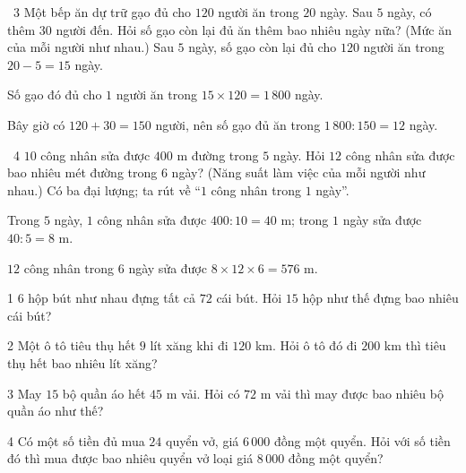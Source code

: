 \gap
\begin{exbox}{\ExWord\ 3}
Một bếp ăn dự trữ gạo đủ cho $120$ người ăn trong $20$ ngày. Sau $5$ ngày, có thêm $30$ người đến. Hỏi số gạo còn lại đủ ăn thêm bao nhiêu ngày nữa? (Mức ăn của mỗi người như nhau.)
\guide
Sau $5$ ngày, số gạo còn lại đủ cho $120$ người ăn trong $20-5=15$ ngày.\par
Số gạo đó đủ cho $1$ người ăn trong $15\times120=1\,800$ ngày.\par
Bây giờ có $120+30=150$ người, nên số gạo đủ ăn trong $1\,800:150=12$ ngày.
\end{exbox}
\gap
\begin{exbox}{\ExWord\ 4}
$10$ công nhân sửa được $400$ m đường trong $5$ ngày. Hỏi $12$ công nhân sửa được bao nhiêu mét đường trong $6$ ngày? (Năng suất làm việc của mỗi người như nhau.)
\guide
Có ba đại lượng; ta rút về ``$1$ công nhân trong $1$ ngày''.\par
Trong $5$ ngày, $1$ công nhân sửa được $400:10=40$ m; trong $1$ ngày sửa được $40:5=8$ m.\par
$12$ công nhân trong $6$ ngày sửa được $8\times12\times6=576$ m.
\end{exbox}
\begin{probbox}{1}{\relax}
$6$ hộp bút như nhau đựng tất cả $72$ cái bút. Hỏi $15$ hộp như thế đựng bao nhiêu cái bút?
\end{probbox}
\gap
\begin{probbox}{2}{\relax}
Một ô tô tiêu thụ hết $9$ lít xăng khi đi $120$ km. Hỏi ô tô đó đi $200$ km thì tiêu thụ hết bao nhiêu lít xăng?
\end{probbox}
\gap
\begin{probbox}{3}{\relax}
May $15$ bộ quần áo hết $45$ m vải. Hỏi có $72$ m vải thì may được bao nhiêu bộ quần áo như thế?
\end{probbox}
\gap
\begin{probbox}{4}{\relax}
Có một số tiền đủ mua $24$ quyển vở, giá $6\,000$ đồng một quyển. Hỏi với số tiền đó thì mua được bao nhiêu quyển vở loại giá $8\,000$ đồng một quyển?
\end{probbox}
